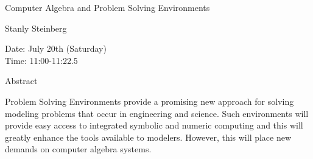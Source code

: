 \begin{center}
\LARGE
Computer Algebra and Problem Solving Environments 

\end{center}

\begin{center}
\Large
Stanly Steinberg

\end{center}

\noindent
Date: July 20th (Saturday)\\
Time:  11:00-11:22.5\\

\begin{center}
\large
Abstract
\end{center}

Problem Solving Environments provide a promising new approach for solving modeling problems
that occur in engineering and science. Such environments will provide easy access to integrated
symbolic and numeric computing and this will greatly enhance the tools available to modelers.
However, this will place new demands on computer algebra systems. 

